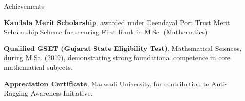 \begin{rubric}{Achievements}

\entry*[2025]%
\textbf{Kandala Merit Scholarship}, awarded under Deendayal Port Trust Merit Scholarship Scheme for securing First Rank in M.Sc. (Mathematics).

\entry*[2020]%
\textbf{Qualified GSET (Gujarat State Eligibility Test)}, Mathematical Sciences, during M.Sc. (2019), demonstrating strong foundational competence in core mathematical subjects.

\entry*[2024]%
\textbf{Appreciation Certificate}, Marwadi University, for contribution to Anti-Ragging Awareness Initiative.

\end{rubric}
